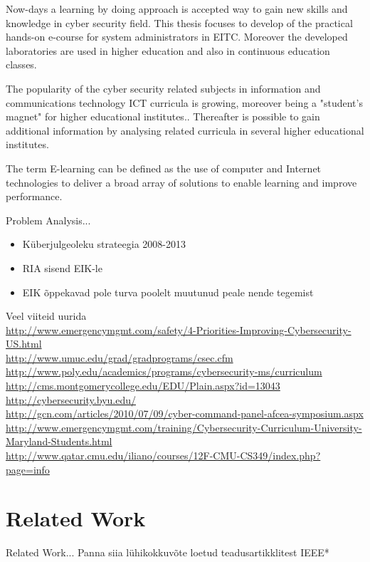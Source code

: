 Now-days a learning by doing approach is accepted way to gain new skills and knowledge in cyber security field. This thesis focuses to develop of the practical hands-on e-course for system administrators in \gls{EITC}. Moreover the developed laboratories are used in higher education and also in continuous education classes.


The popularity of the cyber security related subjects in information and communications technology \gls{ICT} curricula is growing, moreover being a "student's magnet" for higher educational institutes.\citep{CyberIsHot}. Thereafter is possible to gain additional information by analysing related curricula in several higher educational institutes.

The term E-learning can be defined as the use of computer and Internet technologies to deliver a broad array of solutions to enable learning and improve performance. \citep[p.~3]{food2011learning}



Problem Analysis...
\begin{itemize}
	\item Küberjulgeoleku strateegia 2008-2013
	\item RIA sisend EIK-le
	\item EIK õppekavad pole turva poolelt muutunud peale nende tegemist
\end{itemize}


Veel viiteid uurida 
{\scriptsize
\\
\url{http://www.emergencymgmt.com/safety/4-Priorities-Improving-Cybersecurity-US.html}\\
\url{http://www.umuc.edu/grad/gradprograms/csec.cfm}
\\
\url{http://www.poly.edu/academics/programs/cybersecurity-ms/curriculum}\\
\url{http://cms.montgomerycollege.edu/EDU/Plain.aspx?id=13043}\\
\url{http://cybersecurity.byu.edu/}\\
\url{http://gcn.com/articles/2010/07/09/cyber-command-panel-afcea-symposium.aspx}\\
\url{http://www.emergencymgmt.com/training/Cybersecurity-Curriculum-University-Maryland-Students.html}\\
\url{http://www.qatar.cmu.edu/iliano/courses/12F-CMU-CS349/index.php?page=info}\\
}
\section{Related Work}
\label{Related Work}
Related Work...
Panna siia lühikokkuvõte loetud teadusartikklitest IEEE*

